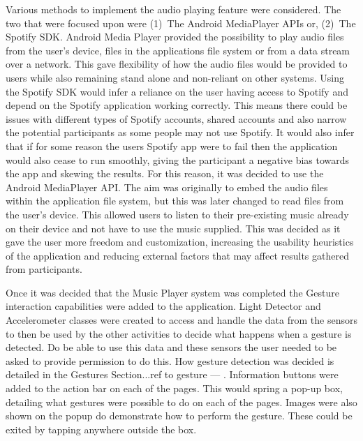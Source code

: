 \documentclass{l4proj}
\begin{document}
Various methods to implement the audio playing feature were considered. The two that were focused upon were (1)~The Android MediaPlayer APIs or, (2)~The Spotify SDK. Android Media Player provided the possibility to play audio files from the user’s device, files in the applications file system or from a data stream over a network. This gave flexibility of how the audio files would be provided to users while also remaining stand alone and non-reliant on other systems. Using the Spotify SDK would infer a reliance on the user having access to Spotify and depend on the Spotify application working correctly. This means there could be issues with different types of Spotify accounts, shared accounts and also narrow the potential participants as some people may not use Spotify. It would also infer that if for some reason the users Spotify app were to fail then the application would also cease to run smoothly, giving the participant a negative bias towards the app and skewing the results. For this reason, it was decided to use the Android MediaPlayer API. The aim was originally to embed the audio files within the application file system, but this was later changed to read files from the user’s device. This allowed users to listen to their pre-existing music already on their device and not have to use the music supplied. This was decided as it gave the user more freedom and customization, increasing the usability heuristics of the application and reducing external factors that may affect results gathered from participants.

Once it was decided that the Music Player system was completed the Gesture interaction capabilities were added to the application. Light Detector and Accelerometer classes were created to access and handle the data from the sensors to then be used by the other activities to decide what happens when a gesture is detected. Do be able to use this data and these sensors the user needed to be asked to provide permission to do this. How gesture detection was decided is detailed in the Gestures Section...ref to gesture --- . Information buttons were added to the action bar on each of the pages. This would spring a pop-up box, detailing what gestures were possible to do on each of the pages. Images were also shown on the popup do demonstrate how to perform the gesture. These could be exited by tapping anywhere outside the box.
\end{document}
